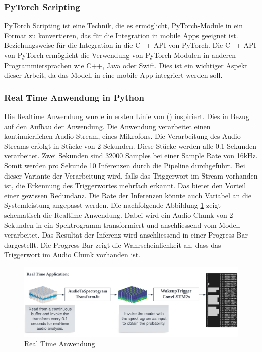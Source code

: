 \documentclass[11pt,a4paper]{article}
\begin{document}
\subsubsection{PyTorch Scripting}
PyTorch Scripting ist eine Technik, die es ermöglicht, PyTorch-Module in ein Format zu konvertieren, 
das für die Integration in mobile Apps geeignet ist. Beziehungsweise für die Integration in die 
C++-API von PyTorch. Die C++-API von PyTorch ermöglicht die Verwendung von PyTorch-Modulen in 
anderen Programmiersprachen wie C++, Java oder Swift. Dies ist ein wichtiger Aspekt dieser Arbeit, 
da das Modell in eine mobile App integriert werden soll.

\subsubsection{Real Time Anwendung in Python}
Die Realtime Anwendung wurde in ersten Linie von (\cite{siri2017hey}) inspiriert. Dies in Bezug 
auf den Aufbau der Anwendung. Die Anwendung verarbeitet einen kontinuierlichen Audio Stream, eines 
Mikrofons. Die Verarbeitung des Audio Streams erfolgt in Stücke von 2 Sekunden. Diese Stücke werden 
alle 0.1 Sekunden verarbeitet. Zwei Sekunden sind 32000 Samples bei einer Sample Rate von 16kHz. 
Somit werden pro Sekunde 10 Inferenzen durch die Pipeline durchgeführt. Bei dieser Variante der 
Verarbeitung wird, falls das Triggerwort im Stream vorhanden ist, die Erkennung des Triggerwortes 
mehrfach erkannt. Das bietet den Vorteil einer gewissen Redundanz. Die Rate der Inferenzen könnte 
auch Variabel an die Systemleistung angepasst werden. Die nachfolgende Abbildung 
\ref{fig:realtime-application} zeigt schematisch die Realtime Anwendung. Dabei wird ein Audio Chunk 
von 2 Sekunden in ein Spektrogramm transformiert und anschliessend vom Modell verarbeitet. Das 
Resultat der Inferenz wird anschliessend in einer Progress Bar dargestellt. Die Progress Bar zeigt 
die Wahrscheinlichkeit an, dass das Triggerwort im Audio Chunk vorhanden ist. 

\begin{figure}[H]
	\centering
	\includegraphics[width=1.0\linewidth, trim=0 10pt 0 10pt, clip]{img/realtime-application.pdf}
	\caption{Real Time Anwendung}
	\label{fig:realtime-application}
\end{figure}
\end{document}
